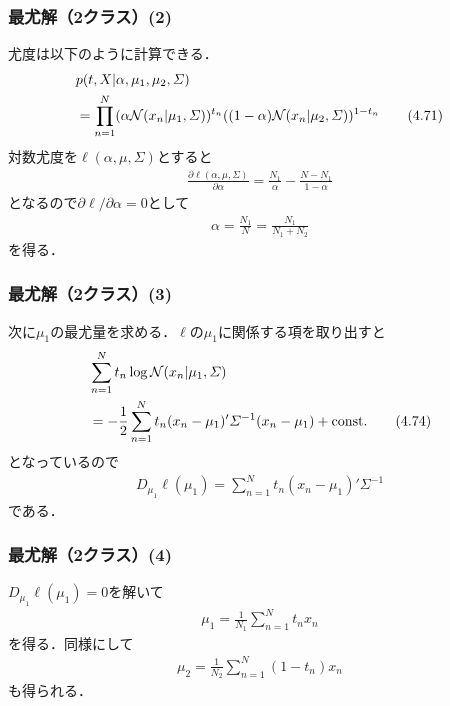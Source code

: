 \documentclass[10pt,%
hyperref={unicode}]{beamer}
\begin{document}
\begin{frame}
    \frametitle{最尤解（2クラス）(2)}
    尤度は以下のように計算できる．
    \begin{align}
        &p(t,X|\alpha,\mu_1,\mu_2,\varSigma) \notag \\
        &=\prod_{n = 1}^N (\alpha \mathcal{N}(x_n|\mu_1,\varSigma))^{t_n}
        ((1 - \alpha)\mathcal{N}(x_n|\mu_2,\varSigma))^{1 - t_n} \tag{4.71}
    \end{align}
    対数尤度を$\ell(\alpha,\mu,\varSigma)$とすると
    \begin{align*}
        \frac{\partial \ell(\alpha,\mu,\varSigma)}{\partial \alpha} =
        \frac{N_1}{\alpha} - \frac{N - N_1}{1 - \alpha}
    \end{align*}
    となるので$\partial \ell / \partial \alpha = 0$として
    \begin{align}
        \alpha = \frac{N_1}{N} = \frac{N_1}{N_1 + N_2} \tag{4.73}
    \end{align}
    を得る．
\end{frame}

\begin{frame}
    \frametitle{最尤解（2クラス）(3)}
    次に$\mu_1$の最尤量を求める．$\ell$の$\mu_1$に関係する項を取り出すと
    \begin{align}
        &\sum_{n = 1}^N t_n \log \mathcal{N}(x_n|\mu_1,\varSigma) \notag \\
        &= - \frac{1}{2} \sum_{n = 1}^N t_n (x_n - \mu_1)' \varSigma^{-1}(x_n - \mu_1)
        + \mathrm{const.} \tag{4.74}
    \end{align}
    となっているので
    \begin{align*}
        D_{\mu_1} \ell(\mu_1) = \sum_{n = 1}^N t_n(x_n - \mu_1)'\varSigma^{-1}
    \end{align*}
    である．
\end{frame}

\begin{frame}
    \frametitle{最尤解（2クラス）(4)}
    $D_{\mu_1}\ell(\mu_1) = 0$を解いて
    \begin{align}
        \mu_1 = \frac{1}{N_1} \sum_{n = 1}^N t_n x_n \tag{4.75}
    \end{align}
    を得る．同様にして
    \begin{align}
        \mu_2 = \frac{1}{N_2} \sum_{n = 1}^N (1 - t_n) x_n \tag{4.76}
    \end{align}
    も得られる．
\end{frame}
\end{document}
